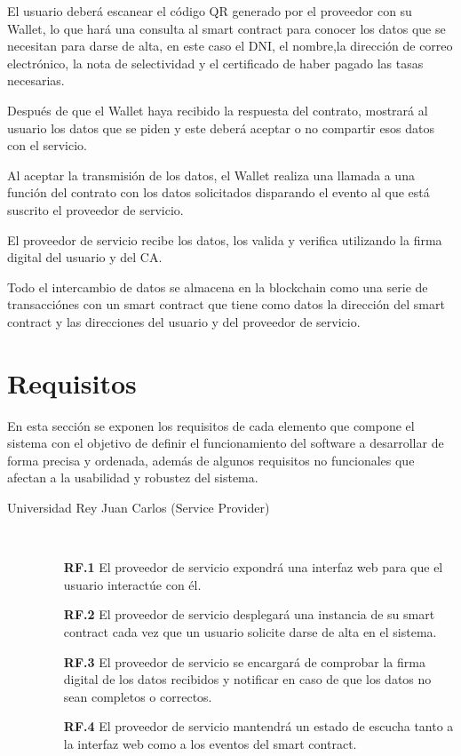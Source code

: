 \documentclass[12pt]{report}
\begin{document}
El usuario deberá escanear el código QR generado por el proveedor con su Wallet, lo que hará una consulta al smart contract para conocer los datos que se necesitan para darse de alta, en este caso el DNI, el nombre,la dirección de correo electrónico, la nota de selectividad y el certificado de haber pagado las tasas necesarias.

Después de que el Wallet haya recibido la respuesta del contrato, mostrará al usuario los datos que se piden y este deberá aceptar o no compartir esos datos con el servicio.

Al aceptar la transmisión de los datos, el Wallet realiza una llamada a una función del contrato con los datos solicitados disparando el evento al que está suscrito el proveedor de servicio.

El proveedor de servicio recibe los datos, los valida y verifica utilizando la firma digital del usuario y del CA.

Todo el intercambio de datos se almacena en la blockchain como una serie de transacciónes con un smart contract que tiene como datos la dirección del smart contract y las direcciones del usuario y del proveedor de servicio.

\section{Requisitos}
En esta sección se exponen los requisitos de cada elemento que compone el sistema con el objetivo de definir el funcionamiento del software a desarrollar de forma precisa y ordenada, además de algunos requisitos no funcionales que afectan a la usabilidad y robustez del sistema.


 
\begin{description}
\item[Universidad Rey Juan Carlos (Service Provider)]\
	\begin{itemize}
	\item[\textbf{RF.1}] El proveedor de servicio expondrá una interfaz web para que el 		usuario interactúe con él.
	\item[\textbf{RF.2}] El proveedor de servicio desplegará una instancia de su smart 		contract cada vez que un usuario solicite darse de alta en el sistema.
	\item[\textbf{RF.3}] El proveedor de servicio se encargará de comprobar la firma 		digital de los datos recibidos y notificar en caso de que los datos no 		sean completos o correctos.
	\item[\textbf{RF.4}] El proveedor de servicio mantendrá un estado de escucha tanto a 	la interfaz web como a los eventos del smart contract.
	\end{itemize}
\end{description}
\end{document}
